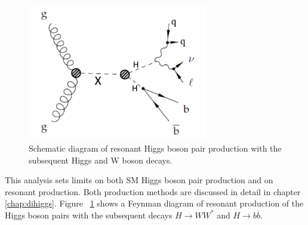 \begin{figure}[h]
\begin{center}
\includegraphics[width=0.7\textwidth]{figures/res_prod}
\caption[Schematic diagram of ${HH\rightarrow b\bar{b}WW^{*}\rightarrow b\bar{b}l\nu qq}$]{Schematic diagram of resonant Higgs boson pair production with the subsequent Higgs and W boson
decays.}
\label{fig:res}
\end{center}
\end{figure}

\indent This analysis sets limits on both SM Higgs boson pair production and on resonant production. Both production methods are discussed in detail in chapter \ref{chap:dihiggs}. Figure ~\ref{fig:res} shows a Feynman diagram of resonant production of the Higgs boson pairs with the subsequent decays ${H\rightarrow WW^{*}}$ and ${H\rightarrow b\overline{b}}$.
